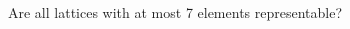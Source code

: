 \documentclass[xcolor=dvipsnames,9pt]{beamer}
\newcommand{\<}{\langle}	     %
\renewcommand{\>}{\rangle}	     %
\begin{document}
\begin{frame}[label=knownresults,shrink=5]{
    Are all lattices with at most 7 elements representable?}
\begin{columns}
\begin{column}{0.2\textwidth}
\begin{center}
\begin{tikzpicture}[scale=.5]
        \end{tikzpicture}
      \end{center}
    \end{column}

    \begin{column}{0.2\textwidth}
      \begin{center}
      \end{center}
    \end{column}

  \end{columns}


  \begin{columns}

    \begin{column}{0.2\textwidth}
      \begin{center}
      \end{center}
    \end{column}


    \begin{column}{0.2\textwidth}
      \begin{center}
      \end{center}
    \end{column}
  \end{columns}
\end{frame}
\end{document}
